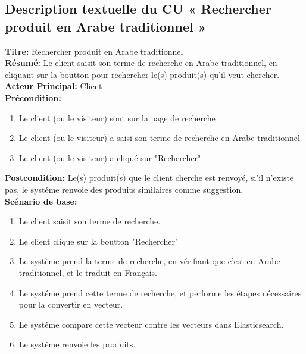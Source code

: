 \subsection{Description textuelle du CU « Rechercher produit en Arabe traditionnel »}
\noindent
\textbf{Titre:} Rechercher produit en Arabe traditionnel \\
\textbf{Résumé:} Le client saisit son terme de recherche en Arabe traditionnel, en cliquant sur la boutton pour rechercher le(s) produit(s) qu'il veut chercher. \\
\textbf{Acteur Principal:} Client \\
\textbf{Précondition:} \begin{enumerate}
	\item Le client (ou le visiteur) sont sur la page de recherche
	\item Le client (ou le visiteur) a saisi son terme de recherche en Arabe traditionnel
	\item Le client (ou le visiteur) a cliqué sur "Rechercher"
\end{enumerate}
\textbf{Postcondition:} Le(s) produit(s) que le client cherche est renvoyé, si'il n'existe pas, le systéme renvoie des produits similaires comme suggestion. \\
\textbf{Scénario de base: }
\begin{enumerate}
	\item Le client saisit son terme de recherche.
	\item Le client clique sur la boutton "Rechercher"
	\item Le système prend la terme de recherche, en vérifiant que c'est en Arabe traditionnel, et le traduit en Français.
	\item Le systéme prend cette terme de recherche, et performe les étapes nécessaires pour la convertir en vecteur.
	\item Le systéme compare cette vecteur contre les vecteurs dans Elasticsearch.
	\item Le systéme renvoie les produits.
\end{enumerate}

